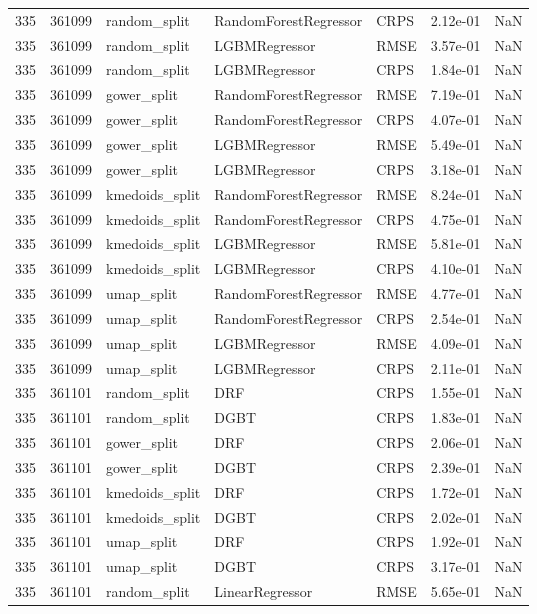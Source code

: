 \begin{tabular}{rrlllrr}
335 & 361099 & random\_split & RandomForestRegressor & CRPS & 2.12e-01 & NaN \\
335 & 361099 & random\_split & LGBMRegressor & RMSE & 3.57e-01 & NaN \\
335 & 361099 & random\_split & LGBMRegressor & CRPS & 1.84e-01 & NaN \\
335 & 361099 & gower\_split & RandomForestRegressor & RMSE & 7.19e-01 & NaN \\
335 & 361099 & gower\_split & RandomForestRegressor & CRPS & 4.07e-01 & NaN \\
335 & 361099 & gower\_split & LGBMRegressor & RMSE & 5.49e-01 & NaN \\
335 & 361099 & gower\_split & LGBMRegressor & CRPS & 3.18e-01 & NaN \\
335 & 361099 & kmedoids\_split & RandomForestRegressor & RMSE & 8.24e-01 & NaN \\
335 & 361099 & kmedoids\_split & RandomForestRegressor & CRPS & 4.75e-01 & NaN \\
335 & 361099 & kmedoids\_split & LGBMRegressor & RMSE & 5.81e-01 & NaN \\
335 & 361099 & kmedoids\_split & LGBMRegressor & CRPS & 4.10e-01 & NaN \\
335 & 361099 & umap\_split & RandomForestRegressor & RMSE & 4.77e-01 & NaN \\
335 & 361099 & umap\_split & RandomForestRegressor & CRPS & 2.54e-01 & NaN \\
335 & 361099 & umap\_split & LGBMRegressor & RMSE & 4.09e-01 & NaN \\
335 & 361099 & umap\_split & LGBMRegressor & CRPS & 2.11e-01 & NaN \\
335 & 361101 & random\_split & DRF & CRPS & 1.55e-01 & NaN \\
335 & 361101 & random\_split & DGBT & CRPS & 1.83e-01 & NaN \\
335 & 361101 & gower\_split & DRF & CRPS & 2.06e-01 & NaN \\
335 & 361101 & gower\_split & DGBT & CRPS & 2.39e-01 & NaN \\
335 & 361101 & kmedoids\_split & DRF & CRPS & 1.72e-01 & NaN \\
335 & 361101 & kmedoids\_split & DGBT & CRPS & 2.02e-01 & NaN \\
335 & 361101 & umap\_split & DRF & CRPS & 1.92e-01 & NaN \\
335 & 361101 & umap\_split & DGBT & CRPS & 3.17e-01 & NaN \\
335 & 361101 & random\_split & LinearRegressor & RMSE & 5.65e-01 & NaN \\

\end{tabular}
